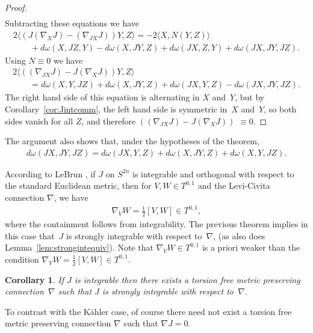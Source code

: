 \documentclass[11pt]{article}
\newtheorem{cor}[thm]{Corollary}
\numberwithin{equation}{section}
\begin{document}
\begin{proof}
\begin{gather*}
\end{gather*}
Subtracting these equations we have
\begin{gather*}
2\langle ( J ( \nabla_X J ) -( \nabla_{JX} J ) ) Y , Z \rangle= -2 \langle X, N(Y,Z) \rangle\\
\qquad{} + d \omega (X,JZ,Y) - d \omega (X,JY,Z) + d \omega (JX,Z,Y) + d \omega (JX,JY,JZ).
\end{gather*}
Using $N \equiv 0$ we have
\begin{gather*}
2\langle ( ( \nabla_{JX} J ) - J ( \nabla_X J ) ) Y , Z \rangle\\
\qquad{} = d \omega (X,Y, JZ) + d \omega (X,JY,Z) + d \omega (JX,Y,Z) - d \omega (JX,JY,JZ).
\end{gather*}
The right hand side of this equation is alternating in $X$ and~$Y$, but by Corollary~\ref{cor:Jintcomm}, the left hand side is symmetric in~$X$ and~$Y$, so both sides vanish for all $Z$, and therefore $ ( ( \nabla_{JX} J ) - J ( \nabla_X J ) )$ $\equiv 0$.
\end{proof}

The argument also shows that, under the hypotheses of the theorem,
\begin{gather*}
d \omega (JX,JY,JZ) = d \omega (JX,Y,Z) + d \omega (X,JY,Z) + d \omega (X,Y, JZ).
\end{gather*}

\begin{rmk} \label{rmk;orthversusstrong}
According to LeBrun \cite{L}, if $J$ on $S^{2n}$ is integrable and orthogonal with respect to the standard Euclidean metric, then for $V,W \in T^{0,1}$ and the Levi-Civita connection $\nabla$, we have
\begin{gather*}
\nabla_V W = \frac 1 2 [V,W] \in T^{0,1},
\end{gather*}
where the containment follows from integrability. The previous theorem implies in this case that~$J$ is strongly integrable with respect to~$\nabla$, (as also does Lemma~\ref{lem:strongintequiv}). Note that $\nabla_V W \in T^{0,1}$ is a priori weaker than the condition $\nabla_V W = \frac 1 2 [V,W] \in T^{0,1}$.
 \end{rmk}

\begin{cor}If $J$ is integrable then there exists a torsion free metric preserving connection~$\nabla$ such that $J$ is strongly integrable with respect to~$\nabla$.
\end{cor}

To contrast with the K\"ahler case, of course there need not exist a torsion free metric preserving connection $\nabla$ such that $\nabla J = 0$.
\end{document}
